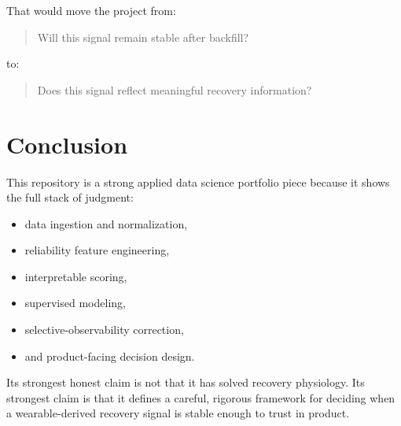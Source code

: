 \documentclass[11pt]{article}
\begin{document}
That would move the project from:
\begin{quote}
Will this signal remain stable after backfill?
\end{quote}
to:
\begin{quote}
Does this signal reflect meaningful recovery information?
\end{quote}

\section{Conclusion}

This repository is a strong applied data science portfolio piece because it shows the full stack of judgment:
\begin{itemize}[leftmargin=1.5em]
    \item data ingestion and normalization,
    \item reliability feature engineering,
    \item interpretable scoring,
    \item supervised modeling,
    \item selective-observability correction,
    \item and product-facing decision design.
\end{itemize}

Its strongest honest claim is not that it has solved recovery physiology. Its strongest claim is that it defines a careful, rigorous framework for deciding when a wearable-derived recovery signal is stable enough to trust in product.
\end{document}
